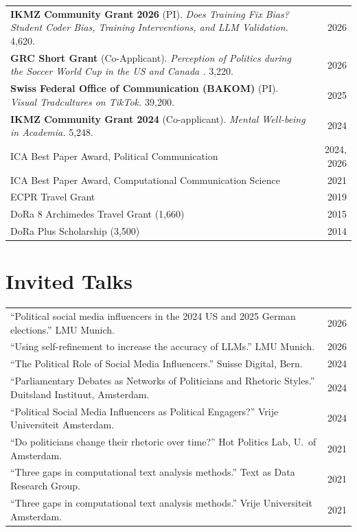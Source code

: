 \documentclass[11pt,a4paper]{article}
\begin{document}
\begin{tabular}{@{}p{}r@{}}
\textbf{IKMZ Community Grant 2026} (PI). \textit{Does Training Fix Bias? Student Coder Bias, Training Interventions, and LLM Validation.} \EUR{}4,620. & 2026 \\[4pt]
\textbf{GRC Short Grant} (Co-Applicant). \textit{Perception of Politics during the Soccer World Cup in the US and Canada .} \EUR{}3,220. & 2026 \\[4pt]
\textbf{Swiss Federal Office of Communication (BAKOM)} (PI). \textit{Visual Tradcultures on TikTok.} \EUR{}39,200. & 2025 \\[4pt]
\textbf{IKMZ Community Grant 2024} (Co-applicant). \textit{Mental Well-being in Academia.} \EUR{}5,248. & 2024 \\[4pt]
ICA Best Paper Award, Political Communication & 2024, 2026 \\[4pt]
ICA Best Paper Award, Computational Communication Science & 2021 \\[4pt]
ECPR Travel Grant & 2019 \\[2pt]
DoRa 8 Archimedes Travel Grant (\EUR{}1,660) & 2015 \\[2pt]
DoRa Plus Scholarship (\EUR{}3,500) & 2014 \\
\end{tabular}


\section{Invited Talks}

\begin{tabular}{@{}p{}r@{}}
``Political social media influencers in the 2024 US and 2025 German elections.'' LMU Munich. & 2026 \\
``Using self-refinement to increase the accuracy of LLMs.'' LMU Munich. & 2026 \\
``The Political Role of Social Media Influencers.'' Suisse Digital, Bern. & 2024 \\
``Parliamentary Debates as Networks of Politicians and Rhetoric Styles.'' Duitsland Instituut, Amsterdam. & 2024 \\
``Political Social Media Influencers as Political Engagers?'' Vrije Universiteit Amsterdam. & 2024 \\
``Do politicians change their rhetoric over time?'' Hot Politics Lab, U.\ of Amsterdam. & 2021 \\
``Three gaps in computational text analysis methods.'' Text as Data Research Group. & 2021 \\
``Three gaps in computational text analysis methods.'' Vrije Universiteit Amsterdam. & 2021 \\
\end{tabular}
\end{document}
